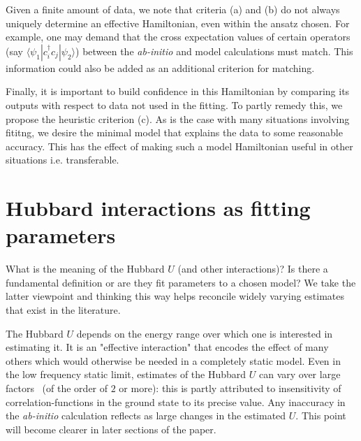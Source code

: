 \documentclass[prl,12pt,onecolumn,nofootinbib,notitlepage,english,superscriptaddress]{revtex4-1}
\begin{document}
Given a finite amount of data, we note that criteria (a) and (b) 
do not always uniquely determine an effective Hamiltonian, 
even within the ansatz chosen. For example, one may demand that 
the cross expectation values of certain operators 
(say $\langle \psi_1 | c_i^{\dagger} c_j | \psi_2 \rangle$) 
between the \emph{ab-initio} and model calculations must match. 
This information could also be added as an 
additional criterion for matching. 

Finally, it is important to build confidence 
in this Hamiltonian by comparing its outputs with respect 
to data not used in the fitting. 
To partly remedy this, we propose the 
heuristic criterion (c). As is the case with many situations 
involving fititng, we desire 
the minimal model that explains the data to 
some reasonable accuracy. This has the effect of making such a 
model Hamiltonian useful in other situations i.e. transferable.

\section{Hubbard interactions as fitting parameters}
\label{sec:fitting}
What is the meaning of the Hubbard $U$ (and other interactions)?
Is there a fundamental definition or are they fit parameters to a chosen model? 
We take the latter viewpoint and thinking this way helps reconcile 
widely varying estimates that exist in the literature. 

The Hubbard $U$ depends on the energy range 
over which one is interested in estimating it. It is an 
"effective interaction" that encodes the effect of many others 
which would otherwise be needed in a completely static model.
Even in the low frequency static limit, estimates 
of the Hubbard $U$ can vary over large factors~\cite{Fei_Lin} 
(of the order of $2$ or more): this is partly attributed to insensitivity 
of correlation-functions in the ground state to its precise value. 
Any inaccuracy in the \emph{ab-initio} calculation reflects as 
large changes in the estimated $U$. This point 
will become clearer in later sections of the paper.
 
\end{document}
